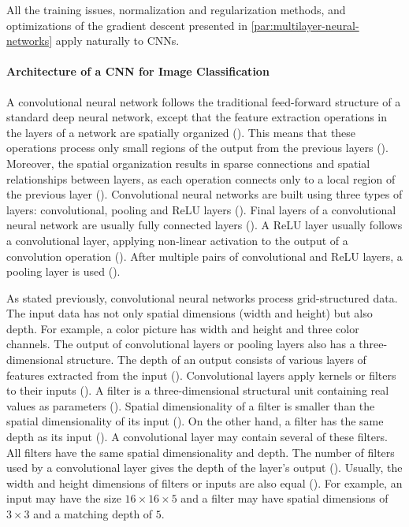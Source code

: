 \documentclass{BachelorBUI}
\begin{document}
        All the training issues, normalization and regularization methods, and optimizations of the gradient descent presented in \autoref{par:multilayer-neural-networks} apply naturally to CNNs.

            \paragraph{Architecture of a CNN for Image Classification}

                A convolutional neural network follows the traditional feed-forward structure of a standard deep neural network, except that the feature extraction operations in the layers of a network are spatially organized (\cite{Aggarwal:2018}). This means that these operations process only small regions of the output from the previous layers (\cite{Aggarwal:2018}). Moreover, the spatial organization results in sparse connections and spatial relationships between layers, as each operation connects only to a local region of the previous layer (\cite{Aggarwal:2018}). Convolutional neural networks are built using three types of layers: convolutional, pooling and ReLU layers (\cite{Aggarwal:2018}). Final layers of a convolutional neural network are usually fully connected layers (\cite{Aggarwal:2018}). A ReLU layer usually follows a convolutional layer, applying non-linear activation to the output of a convolution operation (\cite{Aggarwal:2018}). After multiple pairs of convolutional and ReLU layers, a pooling layer is used (\cite{Aggarwal:2018}).

                As stated previously, convolutional neural networks process grid-structured data. The input data has not only spatial dimensions (width and height) but also depth. For example, a color picture has width and height and three color channels. The output of convolutional layers or pooling layers also has a three-dimensional structure. The depth of an output consists of various layers of features extracted from the input (\cite{Aggarwal:2018}). Convolutional layers apply kernels or filters to their inputs (\cite{Aggarwal:2018}). A filter is a three-dimensional structural unit containing real values as parameters (\cite{Aggarwal:2018}). Spatial dimensionality of a filter is smaller than the spatial dimensionality of its input (\cite{Aggarwal:2018}). On the other hand, a filter has the same depth as its input (\cite{Aggarwal:2018}). A convolutional layer may contain several of these filters. All filters have the same spatial dimensionality and depth. The number of filters used by a convolutional layer gives the depth of the layer's output (\cite{Aggarwal:2018}). Usually, the width and height dimensions of filters or inputs are also equal (\cite{Aggarwal:2018}). For example, an input may have the size $16 \times 16 \times 5$ and a filter may have spatial dimensions of $3 \times 3$ and a matching depth of $5$.
\end{document}

